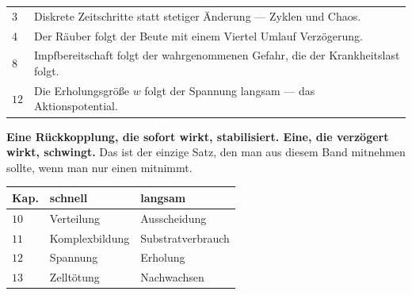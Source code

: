 \begin{merksatz}
\begin{center}
{\small
\renewcommand{\arraystretch}{1.48}
\begin{tabular}{@{}P{1.8cm}P{5.8cm}@{}}
\toprule
$3$ & Diskrete Zeitschritte statt stetiger Änderung --- Zyklen und Chaos.\\
$4$ & Der Räuber folgt der Beute mit einem Viertel Umlauf Verzögerung.\\
$8$ & Impfbereitschaft folgt der wahrgenommenen Gefahr, die der Krankheitslast folgt.\\
$12$ & Die Erholungsgröße $w$ folgt der Spannung langsam --- das Aktionspotential.\\
\bottomrule
\end{tabular}}
\end{center}

\begin{center}
\begin{minipage}{0.9\textwidth}
\textbf{Eine Rückkopplung, die sofort wirkt, stabilisiert. Eine, die verzögert wirkt, schwingt.} Das ist der einzige Satz, den man aus diesem Band mitnehmen sollte, wenn man nur einen mitnimmt.
\end{minipage}
\end{center}
\end{merksatz}

\begin{merksatz}
\begin{center}
{\small
\renewcommand{\arraystretch}{1.48}
\begin{tabular}{@{}P{1.8cm}P{2.6cm}P{3.6cm}@{}}
\toprule
\textbf{Kap.} & \textbf{schnell} & \textbf{langsam}\\
\midrule
$10$ & Verteilung & Ausscheidung\\
$11$ & Komplexbildung & Substratverbrauch\\
$12$ & Spannung & Erholung\\
$13$ & Zelltötung & Nachwachsen\\
\bottomrule
\end{tabular}}
\end{center}

\begin{center}
\begin{minipage}{0.88\textwidth}
\end{minipage}
\end{center}
\end{merksatz}


